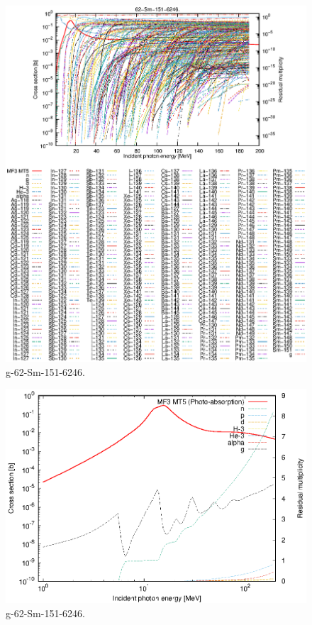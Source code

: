 \begin{figure}
 \includegraphics[width=\linewidth]{eps/g_62-Sm-151_6246.eps}
  \caption{g-62-Sm-151-6246.}
\end{figure}
\newpage \clearpage

\begin{figure}
 \includegraphics[width=\linewidth]{eps-log/g_62-Sm-151_6246.eps}
 \caption{g-62-Sm-151-6246.}
\end{figure}
\newpage \clearpage

